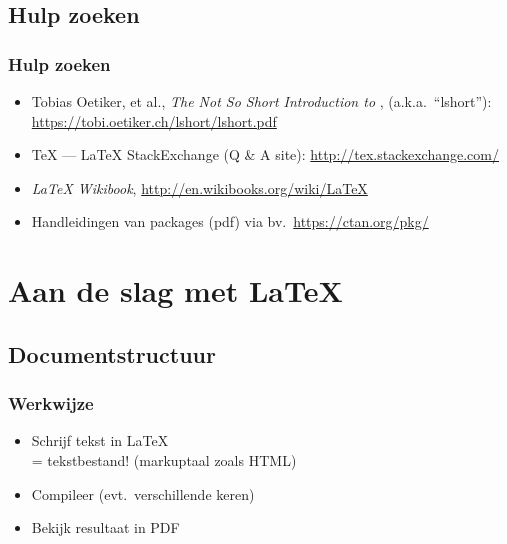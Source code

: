 \documentclass[aspectratio=169]{beamer}
\begin{document}
\subsection{Hulp zoeken}

\begin{frame}
  \frametitle{Hulp zoeken}

  \begin{itemize}
    \item Tobias Oetiker, et al., \emph{The Not So Short Introduction to {\LaTeXe}}, (a.k.a.\ ``lshort''):
    \url{https://tobi.oetiker.ch/lshort/lshort.pdf}
    \item {\TeX} --- {\LaTeX} StackExchange (Q \& A site): \url{http://tex.stackexchange.com/}
    \item \emph{{\LaTeX} Wikibook}, \url{http://en.wikibooks.org/wiki/LaTeX}
    \item Handleidingen van packages (pdf) via bv.\ \url{https://ctan.org/pkg/}
  \end{itemize}

\end{frame}

\section{Aan de slag met {\LaTeX}}

\subsection{Documentstructuur}

\begin{frame}
  \frametitle{Werkwijze}

  \begin{itemize}
    \item<+-> Schrijf tekst in {\LaTeX}\\
    = tekstbestand! (markuptaal zoals HTML)
    \item<+-> Compileer (evt.\ verschillende keren)
    \item<+-> Bekijk resultaat in PDF
  \end{itemize}
\end{frame}
\end{document}
